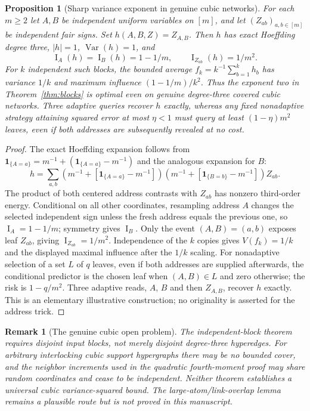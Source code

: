 \documentclass[11pt,letterpaper]{article}
\newtheorem{proposition}[theorem]{Proposition}
\newtheorem{remark}[theorem]{Remark}
\theoremstyle{definition}
\newcommand{\Var}{\operatorname{Var}}
\newcommand{\Inf}{\operatorname{I}}
\begin{document}
\begin{proposition}[Sharp variance exponent in genuine cubic networks]\label{prop:cubic-sharp}
For each $m\ge2$ let $A,B$ be independent uniform variables on
$[m]$, and let $(Z_{ab})_{a,b\in[m]}$ be independent fair signs.
Set $h(A,B,Z)=Z_{A,B}$. Then $h$ has exact Hoeffding degree three,
$|h|=1$, $\Var(h)=1$, and
\begin{equation}\label{eq:cubic-influences}
\Inf_A(h)=\Inf_B(h)=1-1/m,
\qquad \Inf_{Z_{ab}}(h)=1/m^2.
\end{equation}
For $k$ independent such blocks, the bounded average
$f_k=k^{-1}\sum_{b=1}^k h_b$ has variance $1/k$ and maximum influence
$(1-1/m)/k^2$. Thus the exponent two in
Theorem~\ref{thm:blocks} is optimal even on genuine degree-three
covered cubic networks. Three adaptive queries recover $h$ exactly,
whereas any fixed nonadaptive strategy attaining squared error at
most $\eta<1$ must query at least $(1-\eta)m^2$ leaves, even if
both addresses are subsequently revealed at no cost.
\end{proposition}
\begin{proof}
The exact Hoeffding expansion follows from
$\mathbf1_{\{A=a\}}=m^{-1}+(\mathbf1_{\{A=a\}}-m^{-1})$ and the
analogous expansion for $B$:
\[
 h=\sum_{a,b}\left(m^{-1}+\left[\mathbf1_{\{A=a\}}-m^{-1}\right]\right)
 \left(m^{-1}+\left[\mathbf1_{\{B=b\}}-m^{-1}\right]\right)Z_{ab}.
\]
The product of both centered address contrasts with $Z_{ab}$ has
nonzero third-order energy. Conditional on all other coordinates,
resampling address $A$ changes the selected independent sign unless
the fresh address equals the previous one, so
$\Inf_A=1-1/m$; symmetry gives $\Inf_B$. Only the event $(A,B)=(a,b)$
exposes leaf $Z_{ab}$, giving $\Inf_{Z_{ab}}=1/m^2$.
Independence of the $k$ copies gives $V(f_k)=1/k$ and the displayed
maximal influence after the $1/k$ scaling.
For nonadaptive selection of a set $L$ of $q$ leaves, even if both
addresses are supplied afterwards, the conditional predictor is the
chosen leaf when $(A,B)\in L$ and zero otherwise; the risk is
$1-q/m^2$. Three adaptive reads, $A$, $B$ and then $Z_{A,B}$,
recover $h$ exactly. This is an elementary illustrative construction;
no originality is asserted for the address trick.
\end{proof}

\begin{remark}[The genuine cubic open problem]
The independent-block theorem requires disjoint input blocks, not
merely disjoint degree-three hyperedges. For arbitrary interlocking
cubic support hypergraphs there may be no bounded cover, and the
neighbor increments used in the quadratic fourth-moment proof may
share random coordinates and cease to be independent. Neither theorem
establishes a universal cubic variance-squared bound. The
\emph{large-atom/link-overlap lemma} remains a plausible route but is
not proved in this manuscript.
\end{remark}
\end{document}
